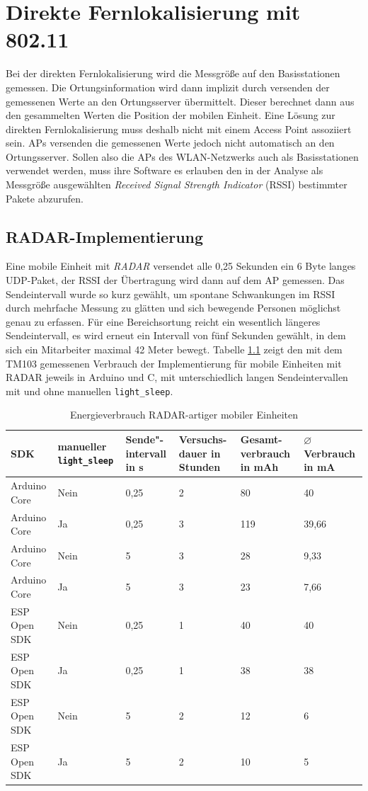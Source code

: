 \chapter{Direkte Fernlokalisierung mit 802.11}
\label{ch:phase2}
Bei der direkten Fernlokalisierung wird die Messgröße auf den Basisstationen gemessen.
Die Ortungsinformation wird dann implizit durch versenden der gemessenen Werte an den Ortungsserver übermittelt.
Dieser berechnet dann aus den gesammelten Werten die Position der mobilen Einheit.
Eine Lösung zur direkten Fernlokalisierung muss deshalb nicht mit einem Access Point assoziiert sein.
APs versenden die gemessenen Werte jedoch nicht automatisch an den Ortungsserver. 
Sollen also die APs des WLAN-Netzwerks auch als Basisstationen verwendet werden, muss ihre Software es erlauben den in der Analyse als Messgröße ausgewählten \emph{Received Signal Strength Indicator} (RSSI) bestimmter Pakete abzurufen.

\section{RADAR-Implementierung}
Eine mobile Einheit mit \emph{RADAR} versendet alle 0,25 Sekunden ein 6 Byte langes UDP-Paket, der RSSI der Übertragung wird dann auf dem AP gemessen.
Das Sendeintervall wurde so kurz gewählt, um spontane Schwankungen im RSSI durch mehrfache Messung zu glätten und sich bewegende Personen möglichst genau zu erfassen.
Für eine Bereichsortung reicht ein wesentlich längeres Sendeintervall, es wird erneut ein Intervall von fünf Sekunden gewählt, in dem sich ein Mitarbeiter maximal 42 Meter bewegt. 
Tabelle \ref{table:radarconsumption} zeigt den mit dem TM103 gemessenen Verbrauch der Implementierung für mobile Einheiten mit RADAR jeweils in Arduino und C, mit unterschiedlich langen Sendeintervallen mit und ohne manuellen \texttt{light\_sleep}.

\begin{table}[h]
	\centering
	\caption{Energieverbrauch RADAR-artiger mobiler Einheiten}
	\label{table:radarconsumption}
	\begin{tabular}{p{3cm}|p{2.2cm}|p{1.5cm}|p{2cm}|p{2cm}|p{2cm}}
		SDK & manueller \texttt{light\_sleep} & Sende"-intervall in s & Versuchs-dauer in Stunden & Gesamt-verbrauch in mAh & $\varnothing$ Verbrauch in mA \\
		\hline
		Arduino Core & Nein & 0,25 & 2 & 80 & 40 \\
		Arduino Core & Ja & 0,25 & 3 & 119 & 39,66 \\
		Arduino Core & Nein & 5 & 3 & 28 & 9,33 \\
		Arduino Core & Ja & 5 & 3 & 23 & 7,66 \\
		ESP Open SDK & Nein & 0,25 & 1 & 40 & 40 \\
		ESP Open SDK & Ja & 0,25 & 1 & 38 & 38 \\
		ESP Open SDK & Nein & 5 & 2 & 12 & 6 \\
		ESP Open SDK & Ja & 5 & 2 & 10 & 5 \\
	\end{tabular}
\end{table}

